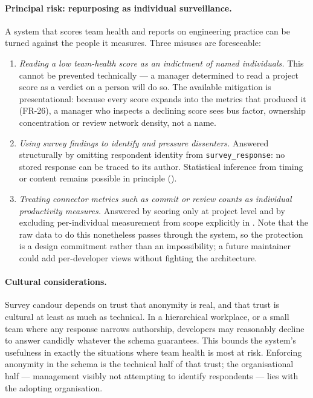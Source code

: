 \paragraph{Principal risk: repurposing as individual surveillance.} A system
that scores team health and reports on engineering practice can be turned
against the people it measures. Three misuses are foreseeable:

\begin{enumerate}
  \item \emph{Reading a low team-health score as an indictment of named
  individuals.} This cannot be prevented technically --- a manager determined to
  read a project score as a verdict on a person will do so. The available
  mitigation is presentational: because every score expands into the metrics
  that produced it (FR-26), a manager who inspects a declining score sees bus
  factor, ownership concentration or review network density, not a name.
  \item \emph{Using survey findings to identify and pressure dissenters.}
  Answered structurally by omitting respondent identity from
  \texttt{survey\_response}: no stored response can be traced to its author.
  Statistical inference from timing or content remains possible in principle
  ().
  \item \emph{Treating connector metrics such as commit or review counts as
  individual productivity measures.} Answered by scoring only at project level
  and by excluding per-individual measurement from scope explicitly in
  . Note that the raw data to do this nonetheless passes
  through the system, so the protection is a design commitment rather than an
  impossibility; a future maintainer could add per-developer views without
  fighting the architecture.
\end{enumerate}

\paragraph{Cultural considerations.} Survey candour depends on trust that
anonymity is real, and that trust is cultural at least as much as technical. In
a hierarchical workplace, or a small team where any response narrows authorship,
developers may reasonably decline to answer candidly whatever the schema
guarantees. This bounds the system's usefulness in exactly the situations where
team health is most at risk. Enforcing anonymity in the schema is the technical
half of that trust; the organisational half --- management visibly not
attempting to identify respondents --- lies with the adopting organisation.

